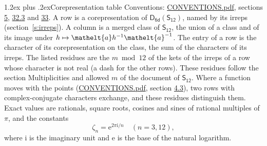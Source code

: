 \documentclass[10pt,a4paper]{article}
\makeatletter
\renewcommand\section{\@startsection{section}{1}{\z@}{-3ex plus -1ex minus -.2ex}%
  {1.2ex plus .2ex}{\normalfont\large\sffamily\bfseries\color{parttitle}}}
\numberwithin{equation}{section}
\newcommand{\eltfont}[1]{{\let\sigma\eltsigma\mathelt{#1}}}
\newcommand{\grp}[1]{\mathsf{#1}}
\newcommand{\elt}[1]{\eltfont{#1}}
\newcommand{\iunit}{\mathrm{i}}
\newcommand{\expe}{\mathrm{e}}
\newcommand{\rootunity}[1]{\zeta_{#1}}
\makeatother
\begin{document}
\section{Corepresentation table}\label{s:character_table}
Conventions: \href{../../CONVENTIONS.pdf}{CONVENTIONS.pdf}, sections \href{../../../rotation/CONVENTIONS.pdf\#conv.5}{5}, \href{../../CONVENTIONS.pdf\#conv.32.3}{32.3} and \href{../../CONVENTIONS.pdf\#conv.33}{33}.
A row is a corepresentation of $\grp{D_{6d}}(\grp{S_{12}})$, named by its irreps (section~\ref{s:irreps}). A column is a merged class of $\grp{S_{12}}$, the union of a class and of its image under $h \mapsto \elt{a} h^{-1} \elt{a}^{-1}$. The entry of a row is the character of its corepresentation on the class, the sum of the characters of its irreps.
\leavevmode\label{n:head.parity}The listed residues are the $m \bmod 12$ of the kets of the irreps of a row whose character is not real (a dash for the other rows). These residues follow the section Multiplicities and allowed $m$ of the document of \href{../../../rotation/data/pdf/S12.pdf}{$\grp{S_{12}}$}. Where a function moves with the points (\href{../../CONVENTIONS.pdf}{CONVENTIONS.pdf}, section \href{../../../rotation/CONVENTIONS.pdf\#conv.4.3}{4.3}), two rows with complex-conjugate characters exchange, and these residues distinguish them.
\leavevmode\label{n:constant.root}\label{n:index.root.order}Exact values are rationals, square roots, cosines and sines of rational multiples of $\pi$, and the constants
\begin{equation}\label{e:constants}\rootunity{n} = \expe^{2\pi\iunit/n}\quad(n = 3, 12),\end{equation}
where $\iunit$ is the imaginary unit and $\expe$ is the base of the natural logarithm.
\end{document}
